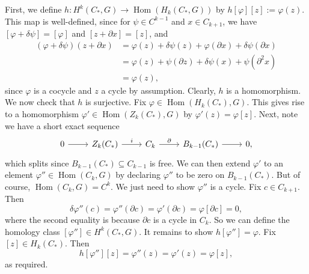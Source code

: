 \documentclass{book}
\renewcommand{\phi}{\varphi}
\DeclareMathOperator{\Hom}{Hom}
\theoremstyle{definition}
\theoremstyle{remark}
\numberwithin{equation}{section}
\begin{document}
First, we define $h \colon H^k(C_*,G) \to \Hom(H_k(C_*,G))$ by $h[\phi][z] := \phi(z)$. This map is well-defined, since for $\psi \in C^{k-1}$ and $x \in C_{k+1}$, we have $[\phi + \delta\psi] = [\phi]$ and $[z + \partial x] = [z]$, and
\begin{equation} \begin{aligned}
    (\phi + \delta\psi)(z + \partial x) &= \phi(z) + \delta\psi(z) + \phi(\partial x) + \delta\psi(\partial x) \\
                                        &= \phi(z) + \psi(\partial z) + \delta\psi(x) + \psi(\partial^2 x)     \\
                                        &= \phi(z),
\end{aligned} \end{equation}
since $\phi$ is a cocycle and $z$ a cycle by assumption. Clearly, $h$ is a homomorphism. We now check that $h$ is surjective. Fix $\phi \in \Hom(H_k(C_*),G)$. This gives rise to a homomorphism $\phi' \in \Hom(Z_k(C_*),G)$ by $\phi'(z) = \phi[z]$. Next, note we have a short exact sequence 
\begin{equation}
    \begin{tikzcd}
        0 \arrow[r] & Z_k(C_*) \arrow[r,"i"] & C_k \arrow[r,"\partial"] & B_{k-1}(C_*) \arrow[r] & 0,
    \end{tikzcd}
\end{equation}
which splits since $B_{k-1}(C_*) \subseteq C_{k-1}$ is free. We can then extend $\phi'$ to an element $\phi'' \in \Hom(C_k,G)$ by declaring $\phi''$ to be zero on $B_{k-1}(C_*)$. But of course, $\Hom(C_k,G) = C^k$. We just need to show $\phi''$ is a cycle. Fix $c \in C_{k+1}$. Then 
\begin{equation}
    \delta\phi''(c) = \phi''(\partial c) = \phi'(\partial c) = \phi[\partial c] = 0,
\end{equation}
where the second equality is because $\partial c$ is a cycle in $C_k$. So we can define the homology class $[\phi''] \in H^k(C_*,G)$. It remains to show $h[\phi''] = \phi$. Fix $[z] \in H_k(C_*)$. Then 
\begin{equation}
    h[\phi''][z] = \phi''(z) = \phi'(z) = \phi[z],
\end{equation}
as required.
\end{document}
